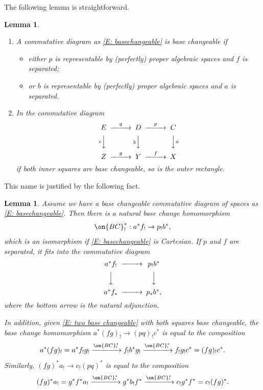 \documentclass[11pt]{amsart}
\newtheorem{lem}[thm]{Lemma}
\theoremstyle{definition}
\theoremstyle{definition}
\theoremstyle{definition}
\numberwithin{equation}{subsection}
\begin{document}
The following lemma is straightforward.
\begin{lem}
\label{L: criterion basechangeable}
\begin{enumerate}
\item A commutative diagram as \eqref{E: basechangeable} is base changeable if
\begin{itemize}
\item either $p$ is representable by (perfectly) proper algebraic spaces and $f$ is separated;
\item or $b$ is representable by (perfectly) proper algebraic spaces and $a$ is separated.
\end{itemize}
\item In the commutative diagram
\begin{equation}
\label{E: two base changeable}
\begin{CD}
E@>q>>D@>p>>C\\
@VcVV@VbVV@VVaV\\
Z@>g>>Y@>f>>X
\end{CD}
\end{equation}
if both inner squares are base changeable, so is the outer rectangle.
\end{enumerate}
\end{lem}

This name is justified by the following fact.

\begin{lem}
\label{L:proper base change}
Assume we have a base changeable commutative diagram of spaces
as \eqref{E: basechangeable}.
Then there is a natural base change homomorphism
\begin{equation}
\label{E: base change isom}
\on{BC}^*_!: a^*f_!\to p_!b^*,
\end{equation}
which is an isomorphism if \eqref{E: basechangeable} is Cartesian.
If $p$ and $f$ are separated, it fits into the commutative diagram 
\[\begin{CD}
a^*f_!@>>> p_!b^*\\
@VVV@VVV\\
a^*f_*@>>>p_*b^*,
\end{CD}\]
where the bottom arrow is the natural adjunction.

In addition, given \eqref{E: two base changeable} with both squares base changeable, the base change homomorphism $a^*(fg)_!\to (pq)_!c^*$ is equal to the composition 
$$a^*(fg)_!=a^*f_!g_!\xrightarrow{\on{BC}_!^*} f_!b^*g_!\xrightarrow{\on{BC}_!^*} f_!g_!c^*=(fg)_!c^*.$$ 
Similarly, $(fg)^*a_!\to c_!(pq)^*$ is equal to the composition
$$(fg)^*a_!=g^*f^*a_!\xrightarrow{\on{BC}_!^*} g^*b_!f^*\xrightarrow{\on{BC}_!^*} c_!g^*f^*=c_!(fg)^*.$$
\end{lem}
\end{document}
